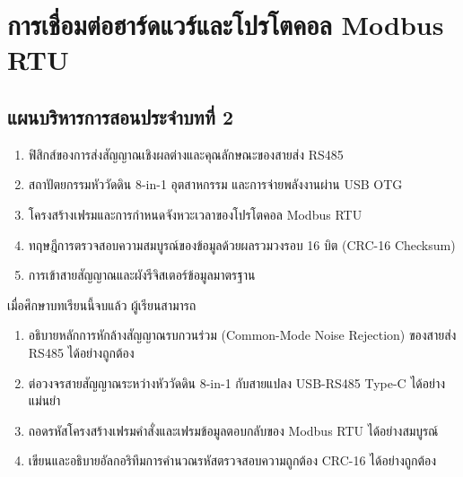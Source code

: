 \chapter{การเชื่อมต่อฮาร์ดแวร์และโปรโตคอล Modbus RTU}
\label{chap:ch02}

\section*{แผนบริหารการสอนประจำบทที่ 2}

\begin{tcolorbox}[
    enhanced, breakable,
    colback=white, colframe=rbruNavy,
    fonttitle=\bfseries\color{white},
    title={1. หัวข้อเนื้อหาประจำบท},
    arc=1.5mm, boxrule=0.8pt, leftrule=3.5mm
]
\begin{enumerate}
    \item ฟิสิกส์ของการส่งสัญญาณเชิงผลต่างและคุณลักษณะของสายส่ง RS485
    \item สถาปัตยกรรมหัววัดดิน 8-in-1 อุตสาหกรรม และการจ่ายพลังงานผ่าน USB OTG
    \item โครงสร้างเฟรมและการกำหนดจังหวะเวลาของโปรโตคอล Modbus RTU
    \item ทฤษฎีการตรวจสอบความสมบูรณ์ของข้อมูลด้วยผลรวมวงรอบ 16 บิต (CRC-16 Checksum)
    \item การเข้าสายสัญญาณและผังรีจิสเตอร์ข้อมูลมาตรฐาน
\end{enumerate}
\end{tcolorbox}

\begin{tcolorbox}[
    enhanced, breakable,
    colback=white, colframe=rbruNavy,
    fonttitle=\bfseries\color{white},
    title={2. วัตถุประสงค์เชิงพฤติกรรม},
    arc=1.5mm, boxrule=0.8pt, leftrule=3.5mm
]
เมื่อศึกษาบทเรียนนี้จบแล้ว ผู้เรียนสามารถ
\begin{enumerate}
    \item อธิบายหลักการหักล้างสัญญาณรบกวนร่วม (Common-Mode Noise Rejection) ของสายส่ง RS485 ได้อย่างถูกต้อง
    \item ต่อวงจรสายสัญญาณระหว่างหัววัดดิน 8-in-1 กับสายแปลง USB-RS485 Type-C ได้อย่างแม่นยำ
    \item ถอดรหัสโครงสร้างเฟรมคำสั่งและเฟรมข้อมูลตอบกลับของ Modbus RTU ได้อย่างสมบูรณ์
    \item เขียนและอธิบายอัลกอริทึมการคำนวณรหัสตรวจสอบความถูกต้อง CRC-16 ได้อย่างถูกต้อง
\end{enumerate}
\end{tcolorbox}


